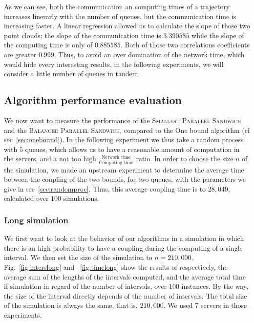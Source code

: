 \documentclass[a4paper,10pt]{article}
\begin{document}
As we can see, both the communication an computing times of a trajectory increases linerarly with the number of queues, but the communication time is increasing faster. A linear regression allowed us to calculate the slope of those two point clouds; the slope of the communication time is $3.390585$ while the slope of the computing time is only of $0.885585$. Both of those two correlations coefficients are greater $0.999$. Thus, to avoid an over domination of the network time, which would hide every interesting results, in the following experiments, we will consider a little number of queues in tandem.

\subsection{Algorithm performance evaluation}
We now want to measure the performance of the \textsc{Smallest Parallel Sandwich} and the \textsc{Balanced Parallel Sandwich}, compared to the One bound algorithm (cf sec~\ref{sec:onebound}). In the following experiment we thus take a random process with $5$ queues, which allows us to have a reasonable amount of computation in the servers, and a not too high $\frac{ \textrm{Network time} }{\textrm{Computing time}}$ ratio. In order to choose the size $n$ of the simulation, we made an upstream experiment to determine the average time between the coupling of the two bounds, for two queues, with the parameters we give in sec~\ref{sec:randomproc}. Thus, this average coupling time is to $28,049$, calculated over $100$ simulations.

\subsubsection{Long simulation}
We first want to look at the behavior of our algorithms in a simulation in which there is an high probability to have a coupling during the computing of a single interval. We then set the size of the simulation to $n = 210,000$. Fig.~\ref{fig:interslong} and ~\ref{fig:timelong} show the results of respectively, the average sum of the lengths of the intervals computed, and the average total time if simulation in regard of the number of intervals, over $100$ instances. By the way, the size of the interval directly depends of the number of intervals. The total size of the simulation is always the same, that is, $210,000$. We used $7$ servers in those experiments.
\end{document}
